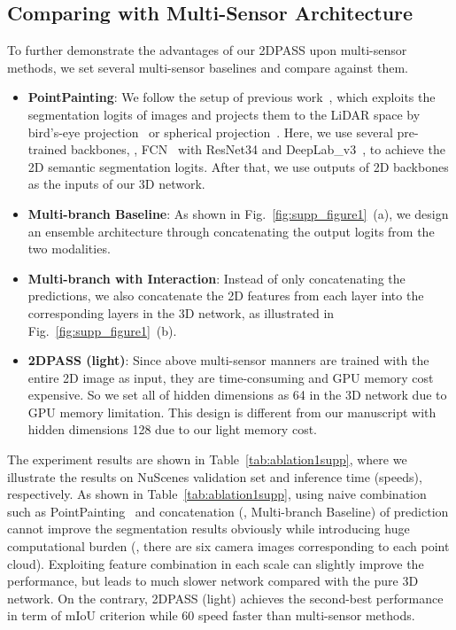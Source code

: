 \documentclass[runningheads]{llncs}
\begin{document}
	\subsection{Comparing with Multi-Sensor Architecture}
	To further demonstrate the advantages of our 2DPASS upon multi-sensor methods, we set several multi-sensor baselines and compare against them.
	\begin{itemize}
		\item \textbf{PointPainting}: We follow the setup of previous work~\cite{vora2020pointpainting}, which exploits the segmentation logits of images and projects them to the LiDAR space by bird's-eye projection~\cite{yuan2018ocnet} or spherical projection~\cite{milioto2019rangenet++}. 
Here, we use several pre-trained backbones, \ie,  FCN~\cite{long2015fully} with ResNet34\cite{he2016deep} and DeepLab\_v3~\cite{chen2017rethinking}, to achieve the 2D semantic segmentation logits.
After that, we use outputs of 2D backbones as the inputs of our 3D network.
		
		
		\item \textbf{Multi-branch Baseline}: As shown in Fig.~\ref{fig:supp_figure1}~(a), we design an ensemble architecture through concatenating the output logits from the two modalities.


		
		\item \textbf{Multi-branch with Interaction}: Instead of only concatenating the predictions, we also concatenate the 2D features from each layer into the corresponding layers in the 3D network, as illustrated in Fig.~\ref{fig:supp_figure1}~(b).
		
		\item \textbf{2DPASS (light)}:  Since above multi-sensor manners are trained with the entire 2D image as input, they are time-consuming and GPU memory cost expensive. So we set all of hidden dimensions as 64 in the 3D network due to GPU memory limitation. This design is different from our manuscript with hidden dimensions 128 due to our light memory cost.
		
	\end{itemize}
	
	The experiment results are shown in Table~\ref{tab:ablation1supp}, where we illustrate the results on NuScenes validation set and inference time (speeds), respectively.
As shown in Table~\ref{tab:ablation1supp}, using naive combination such as PointPainting~\cite{vora2020pointpainting} and concatenation (\ie, Multi-branch Baseline) of prediction cannot improve the segmentation results obviously while introducing huge computational burden (\ie, there are six  camera images corresponding to each point cloud).
Exploiting feature combination in each scale can slightly improve the performance, but leads to much slower network compared with the pure 3D network.
On the contrary, 2DPASS (light) achieves the second-best performance in term of mIoU criterion while 60 speed faster than multi-sensor methods.
	
\end{document}
